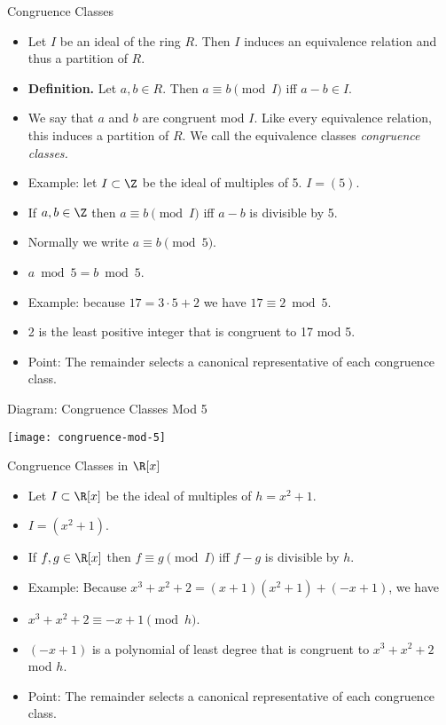 \documentclass[handout]{beamer}
\begin{document}
\begin{frame}{Congruence Classes}

\begin{itemize}
  \item Let $I$ be an ideal of the ring $R$. Then $I$ induces an equivalence relation and thus a partition of $R$.
  \item \textbf{Definition.} Let $a,b\in R$. Then $a \equiv b \pmod I$ iff $a - b \in I$.
  \item We say that $a$ and $b$ are congruent mod $I$. Like every equivalence relation, this induces a partition of
  $R$. We call the equivalence classes \emph{congruence classes.}
  \item Example: let $I\subset \Z$ be the ideal of multiples of 5. $I=(5)$.
  \item If $a,b\in \Z$ then $a\equiv b \pmod I$ iff $a-b$ is divisible by 5.
  \item Normally we write $a\equiv b \pmod 5$.
  \item $a\bmod 5 = b \bmod 5$.
  \item Example: because $17 = 3 \cdot 5 + 2$ we have $17 \equiv 2 \bmod 5$.
  \item 2 is the least positive integer that is congruent to 17 mod 5.
  \item Point: The remainder selects a canonical representative of each congruence class.
\end{itemize}
\end{frame}


\begin{frame}{Diagram: Congruence Classes Mod 5}

\begin{center}
\texttt{[image: congruence-mod-5]}
\end{center}

\end{frame}



\begin{frame}{Congruence Classes in $\R[x]$}

\begin{itemize}
  \item Let $I \subset \R[x]$ be the ideal of multiples of $h = x^2+1$.
  \item $I = (x^2+1)$.
  \item If $f,g\in\R[x]$ then $f\equiv g \pmod I$ iff $f-g$ is divisible by $h$.
  \item Example: Because $x^3 + x^2 + 2 = (x+1)(x^2+1) + ( -x + 1)$, we have
  \item $x^3 + x^2 + 2 \equiv -x +1 \pmod {h}$.
  \item $(-x+1)$ is a polynomial of least degree that is congruent to $x^3 + x^2 + 2$ mod $h$.
  \item Point: The remainder selects a canonical representative of each congruence class.
\end{itemize}
\end{frame}
\end{document}
